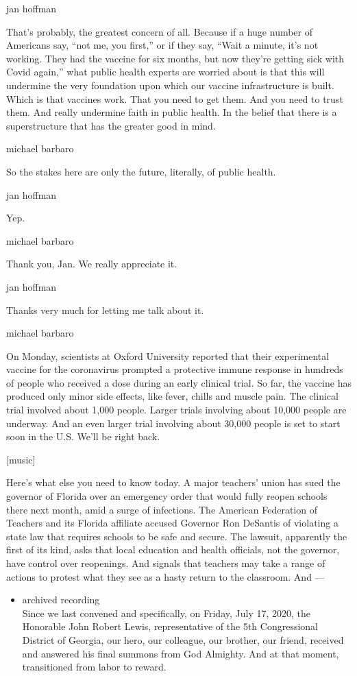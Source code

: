 jan hoffman

That's probably, the greatest concern of all. Because if a huge number
of Americans say, ``not me, you first,'' or if they say, ``Wait a
minute, it's not working. They had the vaccine for six months, but now
they're getting sick with Covid again,'' what public health experts are
worried about is that this will undermine the very foundation upon which
our vaccine infrastructure is built. Which is that vaccines work. That
you need to get them. And you need to trust them. And really undermine
faith in public health. In the belief that there is a superstructure
that has the greater good in mind.

michael barbaro

So the stakes here are only the future, literally, of public health.

jan hoffman

Yep.

michael barbaro

Thank you, Jan. We really appreciate it.

jan hoffman

Thanks very much for letting me talk about it.

michael barbaro

On Monday, scientists at Oxford University reported that their
experimental vaccine for the coronavirus prompted a protective immune
response in hundreds of people who received a dose during an early
clinical trial. So far, the vaccine has produced only minor side
effects, like fever, chills and muscle pain. The clinical trial involved
about 1,000 people. Larger trials involving about 10,000 people are
underway. And an even larger trial involving about 30,000 people is set
to start soon in the U.S. We'll be right back.

{[}music{]}

Here's what else you need to know today. A major teachers' union has
sued the governor of Florida over an emergency order that would fully
reopen schools there next month, amid a surge of infections. The
American Federation of Teachers and its Florida affiliate accused
Governor Ron DeSantis of violating a state law that requires schools to
be safe and secure. The lawsuit, apparently the first of its kind, asks
that local education and health officials, not the governor, have
control over reopenings. And signals that teachers may take a range of
actions to protest what they see as a hasty return to the classroom. And
---

\begin{itemize}
\tightlist
\item
  archived recording\\
  Since we last convened and specifically, on Friday, July 17, 2020, the
  Honorable John Robert Lewis, representative of the 5th Congressional
  District of Georgia, our hero, our colleague, our brother, our friend,
  received and answered his final summons from God Almighty. And at that
  moment, transitioned from labor to reward.
\end{itemize}

